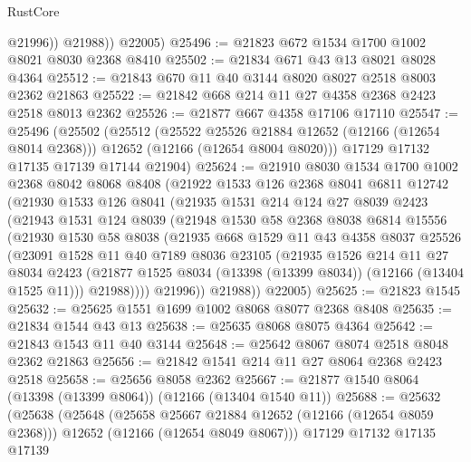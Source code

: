 \begin{lexlean}{RustCore}
\begin{coremodule}
              @21996))
          @21988))
      @22005)
@25496 := @21823 @672 @1534 @1700 @1002 @8021 @8030 @2368 @8410
@25502 := @21834 @671 @43 @13 @8021 @8028 @4364
@25512 := @21843 @670 @11 @40 @3144 @8020 @8027 @2518 @8003 @2362 @21863
@25522 := @21842 @668 @214 @11 @27 @4358 @2368 @2423 @2518 @8013 @2362
@25526 := @21877 @667 @4358 @17106 @17110
@25547 := @25496
    (@25502
      (@25512
        (@25522 @25526 @21884 @12652 (@12166 (@12654 @8014 @2368)))
        @12652
        (@12166 (@12654 @8004 @8020)))
      @17129
      @17132
      @17135
      @17139
      @17144
      @21904)
@25624 := @21910
    @8030
    @1534
    @1700
    @1002
    @2368
    @8042
    @8068
    @8408
    (@21922
      @1533
      @126
      @2368
      @8041
      @6811
      @12742
      (@21930
        @1533
        @126
        @8041
        (@21935
          @1531
          @214
          @124
          @27
          @8039
          @2423
          (@21943
            @1531
            @124
            @8039
            (@21948
              @1530
              @58
              @2368
              @8038
              @6814
              @15556
              (@21930
                @1530
                @58
                @8038
                (@21935
                  @668
                  @1529
                  @11
                  @43
                  @4358
                  @8037
                  @25526
                  (@23091
                    @1528
                    @11
                    @40
                    @7189
                    @8036
                    @23105
                    (@21935
                      @1526
                      @214
                      @11
                      @27
                      @8034
                      @2423
                      (@21877 @1525 @8034 (@13398 (@13399 @8034)) (@12166 (@13404 @1525 @11)))
                      @21988))))
              @21996))
          @21988))
      @22005)
@25625 := @21823 @1545
@25632 := @25625 @1551 @1699 @1002 @8068 @8077 @2368 @8408
@25635 := @21834 @1544 @43 @13
@25638 := @25635 @8068 @8075 @4364
@25642 := @21843 @1543 @11 @40 @3144
@25648 := @25642 @8067 @8074 @2518 @8048 @2362 @21863
@25656 := @21842 @1541 @214 @11 @27 @8064 @2368 @2423 @2518
@25658 := @25656 @8058 @2362
@25667 := @21877 @1540 @8064 (@13398 (@13399 @8064)) (@12166 (@13404 @1540 @11))
@25688 := @25632
    (@25638
      (@25648
        (@25658 @25667 @21884 @12652 (@12166 (@12654 @8059 @2368)))
        @12652
        (@12166 (@12654 @8049 @8067)))
      @17129
      @17132
      @17135
      @17139

\end{coremodule}
\end{lexlean}
